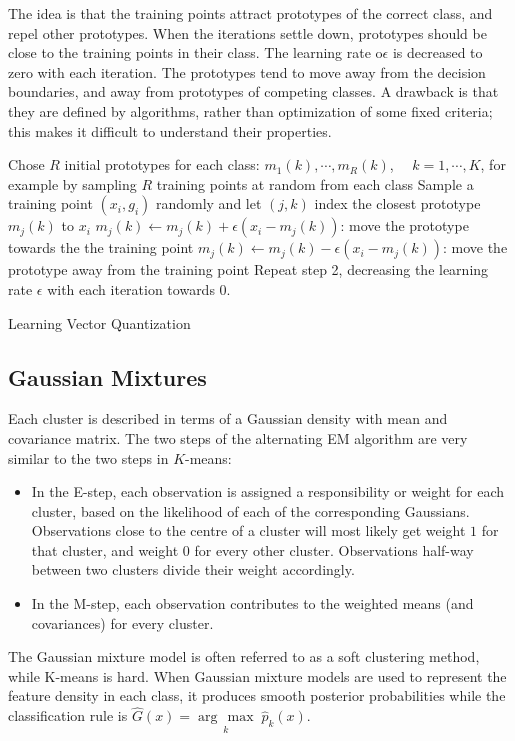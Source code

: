 \documentclass[12pt, letterpaper]{article}
\theoremstyle{definition}
\newcommand{\argmax}[1]{\underset{#1}{\operatorname{arg}\,\operatorname{max}}\;}
\begin{document}
The idea is that the training points attract prototypes of the correct class, and repel other prototypes. When the iterations settle down, prototypes should be close to the training points in their class. The learning rate o$\epsilon$ is decreased to zero with each iteration. The prototypes tend to move away from the decision boundaries, and away from prototypes of competing classes.
A drawback is that they are defined by algorithms, rather than optimization of some fixed
criteria; this makes it difficult to understand their properties.
\begin{algorithm}[H]
\SetAlgoLined
Chose $R$ initial prototypes for each class: $m_1(k),\cdots, m_R(k)$, $\quad k=1,\cdots, K$, for example by sampling $R$ training points at random from each class\;
Sample a training point $(x_i, g_i)$ randomly and let $(j,k)$ index the closest prototype $m_j(k)$ to $x_i$\;
{
	$m_j (k) \leftarrow m_j(k) + \epsilon(x_i-m_j(k))$: move the prototype towards the the training point\;
}
{
	$m_j (k) \leftarrow m_j(k) - \epsilon(x_i-m_j(k))$: move the prototype away from the training point\;
}
Repeat step 2, decreasing the learning rate $\epsilon$ with each iteration towards $0$.
\caption{Learning Vector Quantization}
\end{algorithm}


\subsection{Gaussian Mixtures}
Each cluster is described in terms of a Gaussian density with mean and covariance matrix. The two steps of the alternating EM algorithm are very similar to the two steps in $K$-means:
\begin{itemize}
\item In the E-step, each observation is assigned a responsibility or weight for each cluster, based on the likelihood of each of the corresponding Gaussians. Observations close to the centre of a cluster will most likely get weight $1$ for that cluster, and weight $0$ for every other cluster. Observations half-way between two clusters divide their weight accordingly.
\item In the M-step, each observation contributes to the weighted means (and covariances) for every cluster.
\end{itemize}
The Gaussian mixture model is often referred to as a soft clustering method, while K-means is hard. When Gaussian mixture models are used to represent the feature density in each class, it produces smooth posterior probabilities while the classification rule is $\hat{G}(x) = \argmax{k}{\hat{p}_k(x)}$.
\end{document}
